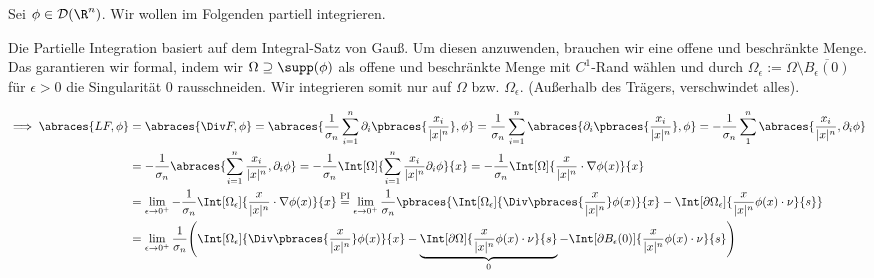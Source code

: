\begin{solution}

\phantom{}


Sei $\phi \in \mathcal{D}(\R^n)$.
Wir wollen im Folgenden partiell integrieren.


Die Partielle Integration basiert auf dem Integral-Satz von Gauß.
Um diesen anzuwenden, brauchen wir eine offene und beschränkte Menge.
Das garantieren wir formal, indem wir $\Omega \supseteq \supp(\phi)$ als offene und beschränkte Menge mit $C^1$-Rand wählen und durch $\Omega_\epsilon := \Omega \setminus \overline{B_\epsilon(0)}$ für $\epsilon > 0$ die Singularität $0$ rausschneiden.
Wir integrieren somit nur auf $\Omega$ bzw. $\Omega_\epsilon$.
(Außerhalb des Trägers, verschwindet alles).


\begin{align*}
  \implies
  \abraces{L F, \phi}
  & =
  \abraces{\Div F, \phi}
  =
  \abraces
  {
    \frac{1}{\sigma_n}
    \sum_{i = 1}^n
    \partial_i
    \pbraces
    {
      \frac{x_i}{|x|^n}
    },
    \phi
  }
  =
  \frac{1}{\sigma_n}
  \sum_{i=1}^n
  \abraces
  {
    \partial_i
    \pbraces
    {
      \frac{x_i}{|x|^n}
    },
    \phi
  }
  =
  -\frac{1}{\sigma_n}
  \sum_{  1}^n
  \abraces
  {
    \frac{x_i}{|x|^n},
    \partial_i \phi
  } \\
  & =
  -\frac{1}{\sigma_n}
  \abraces
  {
    \sum_{i=1}^n
    \frac{x_i}{|x|^n},
    \partial_i \phi
  }
  =
  -\frac{1}{\sigma_n}
  \Int[\Omega]
  {
    \sum_{i = 1}^n
    \frac{x_i}{|x|^n}
    \partial_i \phi
  }{x}
  =
  -\frac{1}{\sigma_n}
  \Int
  [\Omega]
  {
    \frac{x}{|x|^n}
    \cdot
    \nabla \phi(x)
  }{x} \\
  & =
  \lim_{\epsilon \to 0^+}
  -\frac{1}{\sigma_n}
  \Int
  [\Omega_\epsilon]
  {
    \frac{x}{|x|^n}
    \cdot
    \nabla \phi(x)
  }{x}
  \stackrel{\text{PI}}{=}
  \lim_{\epsilon \to 0^+}
  \frac{1}{\sigma_n}
  \pbraces
  {
    \Int
    [\Omega_\epsilon]
    {
      \Div
      \pbraces
      {
        \frac{x}{|x|^n}
      }
      \phi(x)
    }{x}
    -
    \Int
    [\partial \Omega_\epsilon]
    {
      \frac{x}{|x|^n}
      \phi(x)
      \cdot
      \nu
    }{s}
  } \\
  & =
  \lim_{\epsilon \to 0^+}
  \frac{1}{\sigma_n}
  \Bigg (
    \Int
    [\Omega_\epsilon]
    {
      \Div
      \pbraces
      {
        \frac{x}{|x|^n}
      }
      \phi(x)
    }{x}
    -
    \underbrace
    {
      \Int
      [\partial \Omega]
      {
        \frac{x}{|x|^n}
        \phi(x)
        \cdot
        \nu
      }{s}
    }_0
    -
    \Int
    [\partial B_\epsilon(0)]
    {
      \frac{x}{|x|^n}
      \phi(x)
      \cdot
      \nu
    }{s}
  \Bigg )
\end{align*}


\end{solution}
